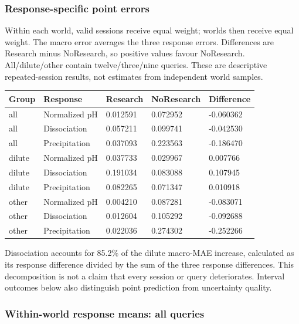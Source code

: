 \documentclass[10pt,a4paper]{article}
\begin{document}
\subsubsection{Response-specific point errors}\label{response-specific-point-errors}

Within each world, valid sessions receive equal weight; worlds then receive equal weight. The macro error averages the three response errors. Differences are Research minus NoResearch, so positive values favour NoResearch. All/dilute/other contain twelve/three/nine queries. These are descriptive repeated-session results, not estimates from independent world samples.

{\def\LTcaptype{table} %
\small\begin{longtable}[]{@{}lllll@{}}
\toprule\noalign{}
Group & Response & Research & NoResearch & Difference \\
\midrule\noalign{}
\endhead
\bottomrule\noalign{}
\endlastfoot
all & Normalized pH & 0.012591 & 0.072952 & -0.060362 \\
all & Dissociation & 0.057211 & 0.099741 & -0.042530 \\
all & Precipitation & 0.037093 & 0.223563 & -0.186470 \\
dilute & Normalized pH & 0.037733 & 0.029967 & 0.007766 \\
dilute & Dissociation & 0.191034 & 0.083088 & 0.107945 \\
dilute & Precipitation & 0.082265 & 0.071347 & 0.010918 \\
other & Normalized pH & 0.004210 & 0.087281 & -0.083071 \\
other & Dissociation & 0.012604 & 0.105292 & -0.092688 \\
other & Precipitation & 0.022036 & 0.274302 & -0.252266 \\
\end{longtable}\normalsize
}

Dissociation accounts for 85.2\% of the dilute macro-MAE increase, calculated as its response difference divided by the sum of the three response differences. This decomposition is not a claim that every session or query deteriorates. Interval outcomes below also distinguish point prediction from uncertainty quality.

\subsubsection{Within-world response means: all queries}\label{within-world-response-means-all-queries}
\end{document}
